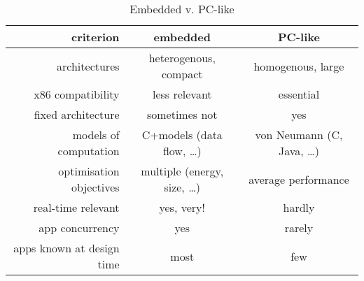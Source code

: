 \begin{table}
  \centering
  \begin{tabular}{r|c|c}
    criterion                 & embedded                   & PC-like                  \\
    \hline
    architectures             & heterogenous, compact      & homogenous, large        \\
    x86 compatibility         & less relevant              & essential                \\
    fixed architecture        & sometimes not              & yes                      \\
    models of computation     & C+models (data flow, …)    & von Neumann (C, Java, …) \\
    optimisation objectives   & multiple (energy, size, …) & average performance      \\
    real-time relevant        & yes, very!                 & hardly                   \\
    app concurrency           & yes                        & rarely                   \\
    apps known at design time & most                       & few                      \\
  \end{tabular}

  \caption{Embedded v. PC-like}
\end{table}